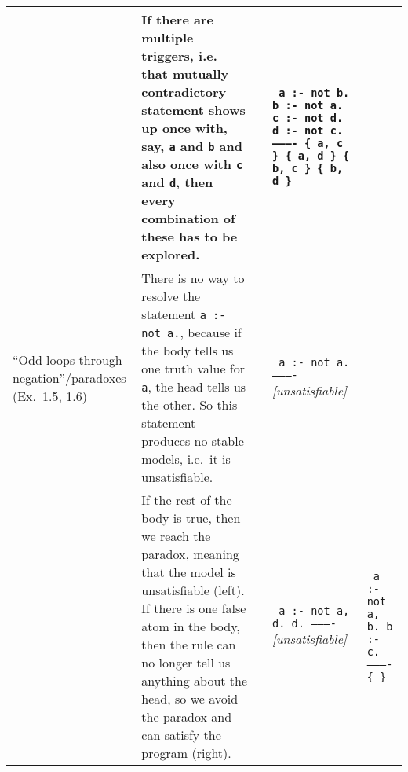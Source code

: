 \documentclass[10pt,a4paper,landscape]{article}
\begin{document}
\begin{longtable}{p{3cm}p{13.5cm}lp{4cm}p{4cm}}
		& If there are multiple triggers, i.e. that mutually contradictory statement shows up once with, say, \texttt{a} and \texttt{b} and also once with \texttt{c} and \texttt{d}, then every combination of these has to be explored.
		&& \texttt{%
			a :- not b. \newline
			b :- not a. \newline
			c :- not d. \newline
			d :- not c. \newline
			---------- \newline
			\{ a, c \} \newline
			\{ a, d \} \newline
			\{ b, c \} \newline
			\{ b, d \}}
		&\\ \midrule
	
	``Odd loops \newline through negation''\slash \newline paradoxes \newline (Ex.\ 1.5, 1.6)
		& There is no way to resolve the statement \texttt{a :- not a.}, because if the body tells us one truth value for \texttt{a}, the head tells us the other.
		So this statement produces no stable models, i.e.\ it is unsatisfiable.		
		&& \texttt{%
			a :- not a. \newline
			---------- \newline}
			\textit{[unsatisfiable]}
		& \\ %
		
		& If the rest of the body is true, then we reach the paradox, meaning that the model is unsatisfiable (left).
		If there is one false atom in the body, then the rule can no longer tell us anything about the head, so we avoid the paradox and can satisfy the program (right).
		&& \texttt{%
			a :- not a, d. \newline
			d. \newline
			---------- \newline}
			\textit{[unsatisfiable]}
		& \texttt{%
			a :- not a, b. \newline
			b :- c. \newline
			---------- \newline
			\{ \} } \\ \midrule


\end{longtable}
\end{document}
